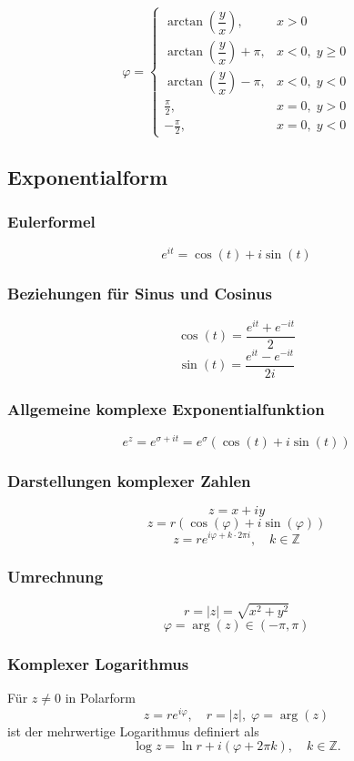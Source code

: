 \documentclass[10pt,a4paper,twocolumn]{article}
\begin{document}
	\[
	\varphi =
	\begin{cases}
		\arctan\left(\dfrac{y}{x}\right), & x > 0 \\[1em]
		\arctan\left(\dfrac{y}{x}\right) + \pi, & x < 0,\; y \ge 0 \\[1em]
		\arctan\left(\dfrac{y}{x}\right) - \pi, & x < 0,\; y < 0 \\[1em]
		\frac{\pi}{2}, & x = 0,\; y > 0 \\[0.5em]
		-\frac{\pi}{2}, & x = 0,\; y < 0
	\end{cases}
	\]
	
	
	\subsection{Exponentialform}
	
	\subsubsection{Eulerformel}
	\[
	e^{it} = \cos(t) + i\sin(t)
	\]
	
	\subsubsection{Beziehungen für Sinus und Cosinus}
	\[
	\cos(t)=\frac{e^{it}+e^{-it}}{2}
	\]
	\[
	\sin(t)=\frac{e^{it}-e^{-it}}{2i}
	\]
	
	\subsubsection{Allgemeine komplexe Exponentialfunktion}
	\[
	e^z = e^{\sigma+it}=e^\sigma(\cos(t)+i\sin(t))
	\]
	
	\subsubsection{Darstellungen komplexer Zahlen}
	\[
	z = x + iy
	\]
	\[
	z = r(\cos(\varphi)+i\sin(\varphi))
	\]
	\[
	z = re^{i\varphi + k\cdot 2\pi i}, \quad k\in\mathbb{Z}
	\]
	
	\subsubsection{Umrechnung}
	\[
	r = |z| = \sqrt{x^2+y^2}
	\]
	\[
	\varphi = \arg(z)\in(-\pi,\pi)
	\]
	
	\subsubsection{Komplexer Logarithmus}
	Für $z \neq 0$ in Polarform
	\[
	z = re^{i\varphi}, \quad r = |z|, \;\varphi = \arg(z)
	\]
	ist der mehrwertige Logarithmus definiert als
	\[
	\log z = \ln r + i(\varphi + 2\pi k), \quad k \in \mathbb{Z}.
	\]
	
\end{document}
